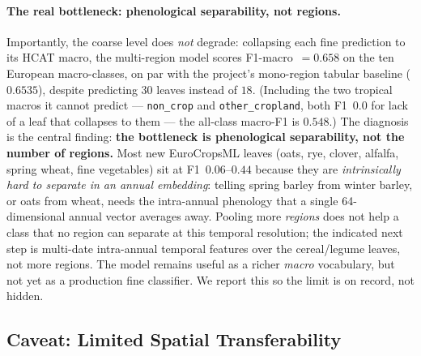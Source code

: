 \paragraph{The real bottleneck: phenological separability, not regions.}
Importantly, the coarse level does \emph{not} degrade: collapsing each fine prediction to its
HCAT macro, the multi-region model scores F1-macro~$=0.658$ on the ten European macro-classes,
on par with the project's mono-region tabular baseline ($0.6535$), despite predicting $30$
leaves instead of $18$. (Including the two tropical macros it cannot predict ---
\texttt{non\_crop} and \texttt{other\_cropland}, both F1~$0.0$ for lack of a leaf that
collapses to them --- the all-class macro-F1 is $0.548$.) The diagnosis is the central
finding: \textbf{the bottleneck is phenological separability, not the number of regions.}
Most new EuroCropsML leaves (oats, rye, clover, alfalfa, spring wheat, fine vegetables) sit at
F1~$0.06$--$0.44$ because they are \emph{intrinsically hard to separate in an annual
embedding}: telling spring barley from winter barley, or oats from wheat, needs the
intra-annual phenology that a single 64-dimensional annual vector averages away. Pooling more
\emph{regions} does not help a class that no region can separate at this temporal resolution;
the indicated next step is multi-date intra-annual temporal features over the cereal/legume
leaves, not more regions. The model remains useful as a richer \emph{macro} vocabulary, but
not yet as a production fine classifier. We report this so the limit is on record, not hidden.

\subsection{Caveat: Limited Spatial Transferability}
\label{sec:multiregion:caveat}

